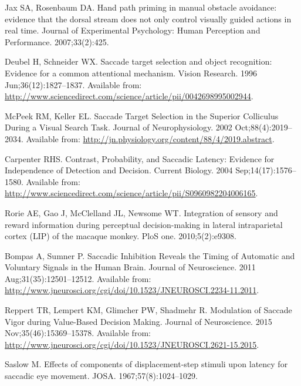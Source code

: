 \documentclass[10pt,letterpaper]{article}
\begin{document}
\begin{thebibliography}{10}
Jax SA, Rosenbaum DA.
\newblock Hand path priming in manual obstacle avoidance: evidence that the
  dorsal stream does not only control visually guided actions in real time.
\newblock Journal of Experimental Psychology: Human Perception and Performance.
  2007;33(2):425.

Deubel H, Schneider WX.
\newblock Saccade target selection and object recognition: {Evidence} for a
  common attentional mechanism.
\newblock Vision Research. 1996 Jun;36(12):1827--1837.
\newblock Available from:
  \url{http://www.sciencedirect.com/science/article/pii/0042698995002944}.

McPeek RM, Keller EL.
\newblock Saccade {Target} {Selection} in the {Superior} {Colliculus} {During}
  a {Visual} {Search} {Task}.
\newblock Journal of Neurophysiology. 2002 Oct;88(4):2019--2034.
\newblock Available from:
  \url{http://jn.physiology.org/content/88/4/2019.abstract}.

Carpenter RHS.
\newblock Contrast, {Probability}, and {Saccadic} {Latency}: {Evidence} for
  {Independence} of {Detection} and {Decision}.
\newblock Current Biology. 2004 Sep;14(17):1576--1580.
\newblock Available from:
  \url{http://www.sciencedirect.com/science/article/pii/S0960982204006165}.

Rorie AE, Gao J, McClelland JL, Newsome WT.
\newblock Integration of sensory and reward information during perceptual
  decision-making in lateral intraparietal cortex ({LIP}) of the macaque
  monkey.
\newblock PloS one. 2010;5(2):e9308.

Bompas A, Sumner P.
\newblock Saccadic {Inhibition} {Reveals} the {Timing} of {Automatic} and
  {Voluntary} {Signals} in the {Human} {Brain}.
\newblock Journal of Neuroscience. 2011 Aug;31(35):12501--12512.
\newblock Available from:
  \url{http://www.jneurosci.org/cgi/doi/10.1523/JNEUROSCI.2234-11.2011}.

Reppert TR, Lempert KM, Glimcher PW, Shadmehr R.
\newblock Modulation of {Saccade} {Vigor} during {Value}-{Based} {Decision}
  {Making}.
\newblock Journal of Neuroscience. 2015 Nov;35(46):15369--15378.
\newblock Available from:
  \url{http://www.jneurosci.org/cgi/doi/10.1523/JNEUROSCI.2621-15.2015}.

Saslow M.
\newblock Effects of components of displacement-step stimuli upon latency for
  saccadic eye movement.
\newblock JOSA. 1967;57(8):1024--1029.


\end{thebibliography}
\end{document}
